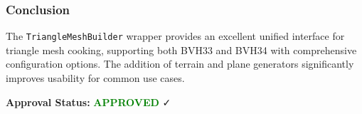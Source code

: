 \subsubsection{Conclusion}

The \texttt{TriangleMeshBuilder} wrapper provides an excellent unified interface for triangle mesh cooking, supporting both BVH33 and BVH34 with comprehensive configuration options. The addition of terrain and plane generators significantly improves usability for common use cases.

\textbf{Approval Status:} \textcolor{green}{\textbf{APPROVED}} ✓

